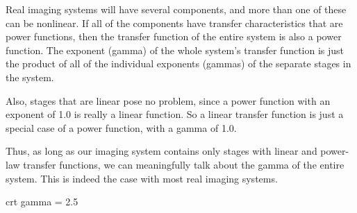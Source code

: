 Real imaging systems will have several components, and more than one
of these can be nonlinear. If all of the components have transfer
characteristics that are power functions, then the transfer function
of the entire system is also a power function. The exponent (gamma) of
the whole system's transfer function is just the product of all of the
individual exponents (gammas) of the separate stages in the system.

Also, stages that are linear pose no problem, since a power function
with an exponent of 1.0 is really a linear function. So a linear
transfer function is just a special case of a power function, with a
gamma of 1.0.

Thus, as long as our imaging system contains only stages with linear
and power-law transfer functions, we can meaningfully talk about the
gamma of the entire system. This is indeed the case with most real
imaging systems.

crt gamma = 2.5